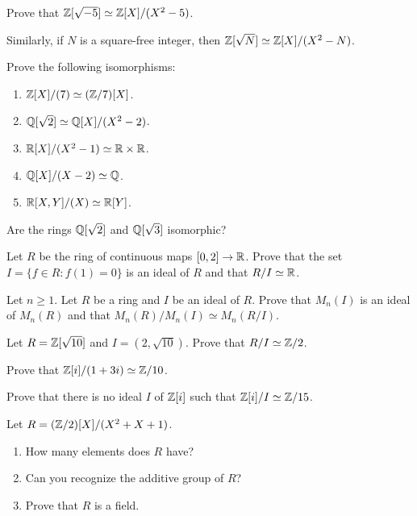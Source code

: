 \begin{exercise}
	Prove that $\mathbb{Z}[\sqrt{-5}]\simeq\mathbb{Z}[X]/(X^2-5)$. 	
\end{exercise}

Similarly, if $N$ is a square-free integer, then 
$\mathbb{Z}[\sqrt{N}]\simeq\mathbb{Z}[X]/(X^2-N)$. 

\begin{exercise}
Prove the following isomorphisms:
\begin{enumerate}
	\item $\mathbb{Z}[X]/(7)\simeq (\mathbb{Z}/7)[X]$.
	\item $\mathbb{Q}[\sqrt{2}]\simeq\mathbb{Q}[X]/(X^2-2)$.
	\item $\mathbb{R}[X]/(X^2-1)\simeq\mathbb{R}\times\mathbb{R}$.
	\item $\mathbb{Q}[X]/(X-2)\simeq\mathbb{Q}$.
	\item $\mathbb{R}[X,Y]/(X)\simeq\mathbb{R}[Y]$. 
\end{enumerate}
\end{exercise}

\begin{exercise}
	Are the rings $\mathbb{Q}[\sqrt{2}]$ and $\mathbb{Q}[\sqrt{3}]$ isomorphic?	
\end{exercise}

\begin{exercise}
	Let $R$ be the ring of continuous maps $[0,2]\to\mathbb{R}$. Prove that the set 
	$I=\{f\in R:f(1)=0\}$ is an ideal of $R$ and that $R/I\simeq\mathbb{R}$.   	
\end{exercise}

\begin{exercise}
	Let $n\geq1$. 
	Let $R$ be a ring and $I$ be an ideal of $R$. Prove that $M_n(I)$ is an ideal 
	of $M_n(R)$ and that $M_n(R)/M_n(I)\simeq M_n(R/I)$. 	
\end{exercise}

\begin{exercise}
	\label{xca:Z[sqrt10]/(2,sqrt10)}
	Let $R=\mathbb{Z}[\sqrt{10}]$ and $I=(2,\sqrt{10})$. Prove that $R/I\simeq\mathbb{Z}/2$. 	
\end{exercise}

\begin{exercise}
\label{xca:Z[i]/(1+3i)}
	Prove that $\mathbb{Z}[i]/(1+3i)\simeq\mathbb{Z}/10$. 	
\end{exercise}

\begin{exercise}
	Prove that there is no ideal $I$ of $\mathbb{Z}[i]$ 
	such that $\mathbb{Z}[i]/I\simeq\mathbb{Z}/15$. 
\end{exercise}

\begin{exercise}
	Let $R=(\mathbb{Z}/2)[X]/(X^2+X+1)$. 
	\begin{enumerate}
		\item How many elements does $R$ have?
		\item Can you recognize the additive group of $R$?
		\item Prove that $R$ is a field. 	
	\end{enumerate}
\end{exercise}

